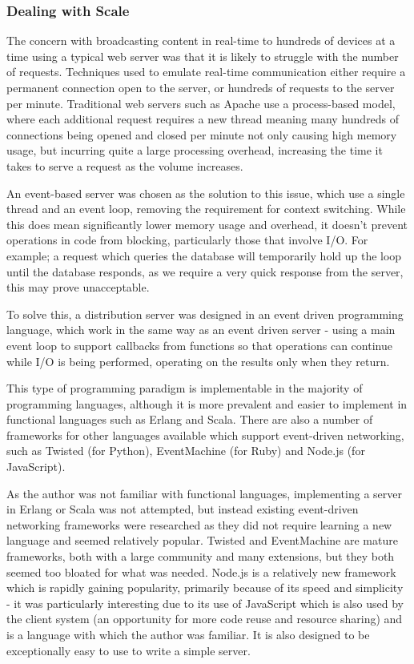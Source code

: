 \documentclass[a4papert,11pt,notitlepage]{ltxdoc}
\begin{document}
\subsubsection{Dealing with Scale}
The concern with broadcasting content in real-time to hundreds of devices at a time using a typical web server was that it is likely to struggle with the number of requests. Techniques used to emulate real-time communication either require a permanent connection open to the server, or hundreds of requests to the server per minute. Traditional web servers such as Apache use a process-based model, where each additional request requires a new thread meaning many hundreds of connections being opened and closed per minute not only causing high memory usage, but incurring quite a large processing overhead, increasing the time it takes to serve a request as the volume increases.

An event-based server was chosen as the solution to this issue, which use a single thread and an event loop, removing the requirement for context switching. While this does mean significantly lower memory usage and overhead, it doesn't prevent operations in code from blocking, particularly those that involve I/O. For example; a request which queries the database will temporarily hold up the loop until the database responds, as we require a very quick response from the server, this may prove unacceptable.

To solve this, a distribution server was designed in an event driven programming language, which work in the same way as an event driven server - using a main event loop to support callbacks from functions so that operations can continue while I/O is being performed, operating on the results only when they return.

This type of programming paradigm is implementable in the majority of programming languages, although it is more prevalent and easier to implement in functional languages such as Erlang and Scala. There are also a number of frameworks for other languages available which support event-driven networking, such as Twisted (for Python), EventMachine (for Ruby) and Node.js (for JavaScript). 

As the author was not familiar with functional languages, implementing a server in Erlang or Scala was not attempted, but instead existing event-driven networking frameworks were researched as they did not require learning a new language and seemed relatively popular. Twisted and EventMachine are mature frameworks, both with a large community and many extensions, but they both seemed too bloated for what was needed. Node.js is a relatively new framework which is rapidly gaining popularity, primarily because of its speed and simplicity - it was particularly interesting due to its use of JavaScript which is also used by the client system (an opportunity for more code reuse and resource sharing) and is a language with which the author was familiar. It is also designed to be exceptionally easy to use to write a simple server.
\end{document}
